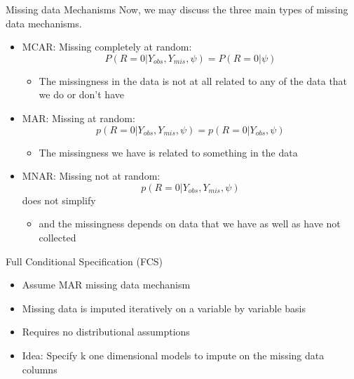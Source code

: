 \begin{frame}{Missing data Mechanisms}
Now, we may discuss the three main types of missing data mechanisms. 
\begin{itemize}

\item MCAR: Missing completely at random:  $$P(R=0|Y_{obs},Y_{mis},\psi)=P(R=0|\psi)$$
\begin{itemize}
\item The missingness in the data is not at all related to any of the data that we do or don't have
\end{itemize}
\item MAR: Missing at random: $$p(R=0|Y_{obs},Y_{mis},\psi)= p(R=0|Y_{obs},\psi)$$
\begin{itemize}
 \item The missingness we have is related to something in the data 
\end{itemize}
\item MNAR: Missing not at random: $$p(R=0|Y_{obs},Y_{mis},\psi)$$ does not simplify
\begin{itemize}
 \item  and the missingness depends on data that we have as well as have not collected
\end{itemize}


\end{itemize}
 
\end{frame}


\begin{frame}{Full Conditional Specification (FCS)}
 \begin{itemize}
  \item Assume MAR missing data mechanism %
  \item Missing data is imputed iteratively on a variable by variable basis
  \item Requires no distributional assumptions
  \item Idea: Specify k one dimensional models to impute on the missing data columns
 \end{itemize}

\end{frame}


